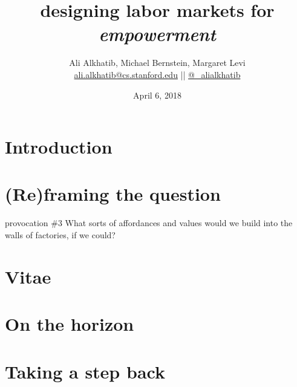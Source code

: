 \documentclass[aspectratio=169,12pt]{beamer} %
\title{designing labor markets for \textit{empowerment}}
\subtitle{\onslide<2->{provocations to imagine different forms of empowerment}}
\author{{Ali Alkhatib}, Michael Bernstein, Margaret Levi\\
\href{mailto:ali.alkhatib@cs.stanford.edu}{ali.alkhatib@cs.stanford.edu} ||
         \href{http://twitter.com/_alialkhatib}{@\_alialkhatib}}
\institute[Stanford]{MediaX}
\date{April 6, 2018}
\newcommand{\onlyinsubfile}[1]{#1}
\newcommand{\notinsubfile}[1]{}
\begin{document}
\renewcommand{\onlyinsubfile}[1]{}
\renewcommand{\notinsubfile}[1]{#1}

\begin{frame}
\titlepage
\end{frame}







\section{Introduction}


% 

% 

\section{(Re)framing the question}


\begin{frame}[standout]{provocation \#3}
  What sorts of \alert{affordances} and \alert{values} would we build into the walls of factories, if we could?
\end{frame}


\section{Vitae}


\section{On the horizon}



% 
\section{Taking a step back}






\end{document}
